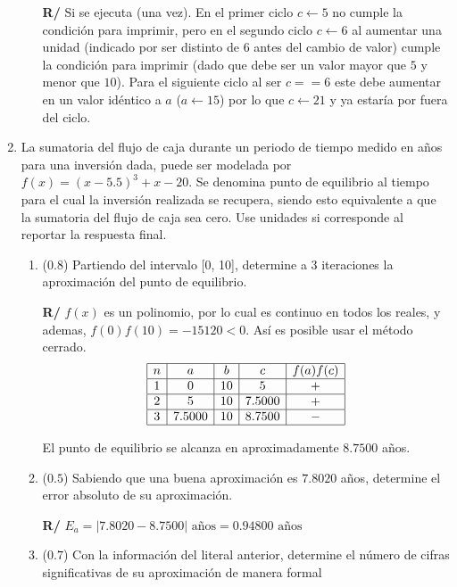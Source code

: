 \documentclass[12pt]{article}
\begin{document}
\begin{enumerate}[leftmargin=*,widest=9]
\begin{enumerate}[label=\alph*]
    \textbf{R/} Si se ejecuta (una vez). En el primer ciclo \(c \gets 5\) no cumple la condición para imprimir, pero en el segundo ciclo \(c \gets 6\) al aumentar una unidad (indicado por ser distinto de \(6\) antes del cambio de valor) cumple la condición para imprimir (dado que debe ser un valor mayor que \(5\) y menor que \(10\)). Para el siguiente ciclo al ser \(c== 6\) este debe aumentar en un valor idéntico a \(a\) (\(a \gets 15\)) por lo que \(c \gets 21\) y ya estaría por fuera del ciclo.
    \end{enumerate}


    \item La sumatoria del flujo de caja durante un periodo de tiempo medido en años para una inversión dada, puede ser modelada por \(f(x) = (x-5.5)^3 + x - 20\). Se denomina punto de equilibrio al tiempo para el cual la inversión realizada se recupera, siendo esto equivalente a que la sumatoria del flujo de caja sea cero. Use unidades si corresponde al reportar la respuesta final.

    \begin{enumerate}[label=\alph*]
    \item (\(0.8\)) Partiendo del intervalo [0, 10], determine a 3 iteraciones la aproximación del punto de equilibrio.


\textbf{R/} \(f(x)\) es un polinomio, por lo cual es continuo en todos los reales, y ademas, \(f(0)f(10)= -15120 < 0\). Así es posible usar el método cerrado.
\[
\begin{array}{|c|c|c|c|c|}
  \hline
  n & a & b & c & f(a)f(c)\\
  \hline
  1 & 0 & 10 & 5 & + \\
  \hline
  2 & 5 & 10 & 7.5000 & + \\
  \hline
  3 & 7.5000 & 10 & 8.7500 & - \\
  \hline
 \end{array}
\]

El punto de equilibrio se alcanza en aproximadamente \(8.7500\) años.


    \item (\(0.5\)) Sabiendo que una buena aproximación es \(7.8020\) años, determine el error absoluto de su aproximación.


\textbf{R/} \(E_a = |7.8020 - 8.7500| \text{ años} = 0.94800 \text{ años}\)


    \item (\(0.7\)) Con la información del literal anterior, determine el número de cifras significativas de su aproximación de manera formal



\end{enumerate}
\end{enumerate}
\end{document}
